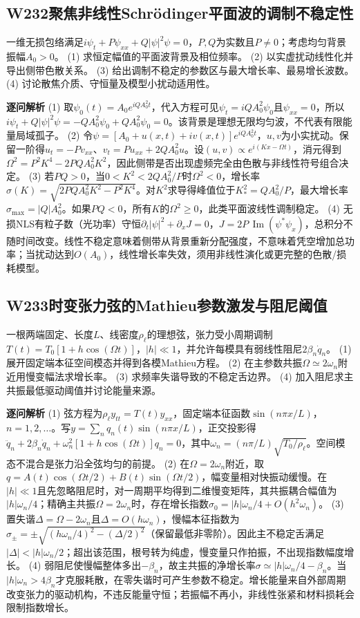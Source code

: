\subsection*{W232\quad 聚焦非线性Schrödinger平面波的调制不稳定性}
一维无损包络满足$i\psi_t+P\psi_{xx}+Q|\psi|^2\psi=0$，$P,Q$为实数且$P\ne0$；考虑均匀背景振幅$A_0>0$。
(1) 求恒定幅值的平面波背景及相位频率。
(2) 以实虚扰动线性化并导出侧带色散关系。
(3) 给出调制不稳定的参数区与最大增长率、最易增长波数。
(4) 讨论散焦介质、守恒量及模型小扰动适用性。
\par\textbf{逐问解析}
(1) 取$\psi_0(t)=A_0e^{iQA_0^2t}$，代入方程可见$\psi_t=iQA_0^2\psi_0$且$\psi_{xx}=0$，所以$i\psi_t+Q|\psi|^2\psi=-QA_0^2\psi_0+QA_0^2\psi_0=0$。该背景是理想无限均匀波，不代表有限能量局域孤子。
(2) 令$\psi=[A_0+u(x,t)+iv(x,t)]e^{iQA_0^2t}$，$u,v$为小实扰动。保留一阶得$u_t=-P v_{xx}$、$v_t=P u_{xx}+2QA_0^2u$。设$(u,v)\propto e^{i(Kx-\Omega t)}$，消元得到$\Omega^2=P^2K^4-2PQA_0^2K^2$，因此侧带是否出现虚频完全由色散与非线性符号组合决定。
(3) 若$PQ>0$，当$0<K^2<2QA_0^2/P$时$\Omega^2<0$，增长率$\sigma(K)=\sqrt{2PQA_0^2K^2-P^2K^4}$。对$K^2$求导得峰值位于$K_*^2=QA_0^2/P$，最大增长率$\sigma_{\max}=|Q|A_0^2$。如果$PQ<0$，所有$K$的$\Omega^2\ge0$，此类平面波线性调制稳定。
(4) 无损NLS有粒子数（光功率）守恒$\partial_t|\psi|^2+\partial_x J=0$，$J=2P\,\operatorname{Im}(\psi^*\psi_x)$，总积分不随时间改变。线性不稳定意味着侧带从背景重新分配强度，不意味着凭空增加总功率；当扰动达到$O(A_0)$，线性增长率失效，须用非线性演化或更完整的色散/损耗模型。
\par\medskip
\subsection*{W233\quad 时变张力弦的Mathieu参数激发与阻尼阈值}
一根两端固定、长度$L$、线密度$\rho_\ell$的理想弦，张力受小周期调制$T(t)=T_0[1+h\cos(\Omega t)]$，$|h|\ll1$，并允许每模具有弱线性阻尼$2\beta_n\dot q_n$。
(1) 展开固定端本征空间模态并得到各模Mathieu方程。
(2) 在主参数共振$\Omega\simeq2\omega_n$附近用慢变幅法求增长率。
(3) 求频率失谐导致的不稳定舌边界。
(4) 加入阻尼求主共振最低驱动阈值并讨论能量来源。
\par\textbf{逐问解析}
(1) 弦方程为$\rho_\ell y_{tt}=T(t)y_{xx}$，固定端本征函数$\sin(n\pi x/L)$，$n=1,2,\ldots$。写$y=\sum_nq_n(t)\sin(n\pi x/L)$，正交投影得$\ddot q_n+2\beta_n\dot q_n+\omega_n^2[1+h\cos(\Omega t)]q_n=0$，其中$\omega_n=(n\pi/L)\sqrt{T_0/\rho_\ell}$。空间模态不混合是张力沿全弦均匀的前提。
(2) 在$\Omega=2\omega_n$附近，取$q=A(t)\cos(\Omega t/2)+B(t)\sin(\Omega t/2)$，幅变量相对快振动缓慢。在$|h|\ll1$且先忽略阻尼时，对一周期平均得到二维慢变矩阵，其共振耦合幅值为$|h|\omega_n/4$；精确主共振$\Omega=2\omega_n$时，存在增长指数$\sigma_0=|h|\omega_n/4+O(h^2\omega_n)$。
(3) 置失谐$\Delta=\Omega-2\omega_n$且$\Delta=O(h\omega_n)$，慢幅本征指数为$\sigma_\pm=\pm\sqrt{(h\omega_n/4)^2-(\Delta/2)^2}$（保留最低非零阶）。因此主不稳定舌满足$|\Delta|<|h|\omega_n/2$；超出该范围，根号转为纯虚，慢变量只作拍振，不出现指数幅度增长。
(4) 弱阻尼使慢幅整体多出$-\beta_n$，故主共振的净增长率$\sigma\simeq|h|\omega_n/4-\beta_n$。当$|h|\omega_n>4\beta_n$才克服耗散，在零失谐时可产生参数不稳定。增长能量来自外部周期改变张力的驱动机构，不违反能量守恒；若振幅不再小，非线性张紧和材料损耗会限制指数增长。
\par\medskip
